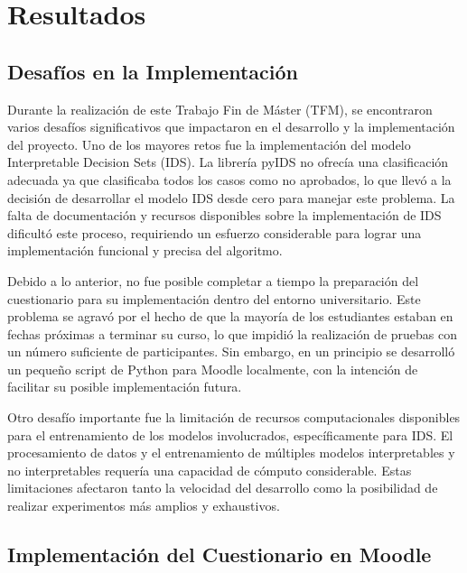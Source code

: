 \chapter{Resultados}

\section{Desafíos en la Implementación}

Durante la realización de este Trabajo Fin de Máster (TFM), se encontraron varios desafíos significativos que impactaron en el desarrollo y la implementación del proyecto. Uno de los mayores retos fue la implementación del modelo Interpretable Decision Sets (IDS). La librería pyIDS no ofrecía una clasificación adecuada ya que clasificaba todos los casos como no aprobados, lo que llevó a la decisión de desarrollar el modelo IDS desde cero para manejar este problema. La falta de documentación y recursos disponibles sobre la implementación de IDS dificultó este proceso, requiriendo un esfuerzo considerable para lograr una implementación funcional y precisa del algoritmo.

Debido a lo anterior, no fue posible completar a tiempo la preparación del cuestionario para su implementación dentro del entorno universitario. Este problema se agravó por el hecho de que la mayoría de los estudiantes estaban en fechas próximas a terminar su curso, lo que impidió la realización de pruebas con un número suficiente de participantes. Sin embargo, en un principio se desarrolló un pequeño script de Python para Moodle localmente, con la intención de facilitar su posible implementación futura.

Otro desafío importante fue la limitación de recursos computacionales disponibles para el entrenamiento de los modelos involucrados, específicamente para IDS. El procesamiento de datos y el entrenamiento de múltiples modelos interpretables y no interpretables requería una capacidad de cómputo considerable. Estas limitaciones afectaron tanto la velocidad del desarrollo como la posibilidad de realizar experimentos más amplios y exhaustivos.

\section{Implementación del Cuestionario en Moodle}

